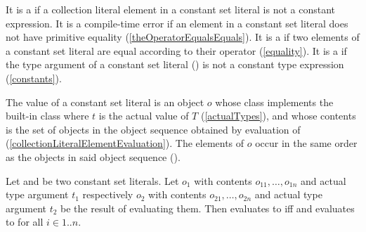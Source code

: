 \documentclass[makeidx]{article}
\begin{document}
{

\LMHash{}%
It is a  if
a collection literal element in a constant set literal
is not a constant expression.
It is a compile-time error if
an element in a constant set literal
does not have primitive equality
(\ref{theOperatorEqualsEquals}).
It is a
 if two elements of a constant set literal are equal
according to their \lit{==} operator
(\ref{equality}).
It is a  if the type argument of a constant set literal
()
is not a constant type expression
(\ref{constants}).


\LMHash{}%
The value of a constant set literal
is an object $o$ whose class implements the built-in class
where $t$ is the actual value of $T$
(\ref{actualTypes}),
and whose contents is the set of objects in
the object sequence  obtained by
evaluation of 
(\ref{collectionLiteralElementEvaluation}).
The elements of $o$ occur in the same order as
the objects in said object sequence
().

\LMHash{}%
Let 
and 
be two constant set literals.
Let $o_1$ with contents $o_{11}, \ldots, o_{1n}$ and actual type argument $t_1$
respectively
$o_2$ with contents $o_{21}, \ldots, o_{2n}$ and actual type argument $t_2$
be the result of evaluating them.
Then  evaluates to \TRUE{} if{}f
 and 
evaluates to \TRUE{} for all $i \in 1 .. n$.


}
\end{document}
